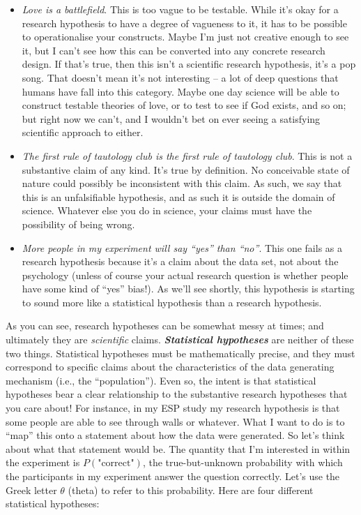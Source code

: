 \documentclass[
]{book}
\providecommand{\tightlist}{%
  \setlength{\itemsep}{0pt}\setlength{\parskip}{0pt}}
\begin{document}
\begin{itemize}
\tightlist
\item
  \emph{Love is a battlefield}. This is too vague to be testable. While it's okay for a research hypothesis to have a degree of vagueness to it, it has to be possible to operationalise your constructs. Maybe I'm just not creative enough to see it, but I can't see how this can be converted into any concrete research design. If that's true, then this isn't a scientific research hypothesis, it's a pop song. That doesn't mean it's not interesting -- a lot of deep questions that humans have fall into this category. Maybe one day science will be able to construct testable theories of love, or to test to see if God exists, and so on; but right now we can't, and I wouldn't bet on ever seeing a satisfying scientific approach to either.
\item
  \emph{The first rule of tautology club is the first rule of tautology club}. This is not a substantive claim of any kind. It's true by definition. No conceivable state of nature could possibly be inconsistent with this claim. As such, we say that this is an unfalsifiable hypothesis, and as such it is outside the domain of science. Whatever else you do in science, your claims must have the possibility of being wrong.
\item
  \emph{More people in my experiment will say ``yes'' than ``no''}. This one fails as a research hypothesis because it's a claim about the data set, not about the psychology (unless of course your actual research question is whether people have some kind of ``yes'' bias!). As we'll see shortly, this hypothesis is starting to sound more like a statistical hypothesis than a research hypothesis.
\end{itemize}

As you can see, research hypotheses can be somewhat messy at times; and ultimately they are \emph{scientific} claims. \textbf{\emph{Statistical hypotheses}} are neither of these two things. Statistical hypotheses must be mathematically precise, and they must correspond to specific claims about the characteristics of the data generating mechanism (i.e., the ``population''). Even so, the intent is that statistical hypotheses bear a clear relationship to the substantive research hypotheses that you care about! For instance, in my ESP study my research hypothesis is that some people are able to see through walls or whatever. What I want to do is to ``map'' this onto a statement about how the data were generated. So let's think about what that statement would be. The quantity that I'm interested in within the experiment is \(P(\mbox{"correct"})\), the true-but-unknown probability with which the participants in my experiment answer the question correctly. Let's use the Greek letter \(\theta\) (theta) to refer to this probability. Here are four different statistical hypotheses:
\end{document}
